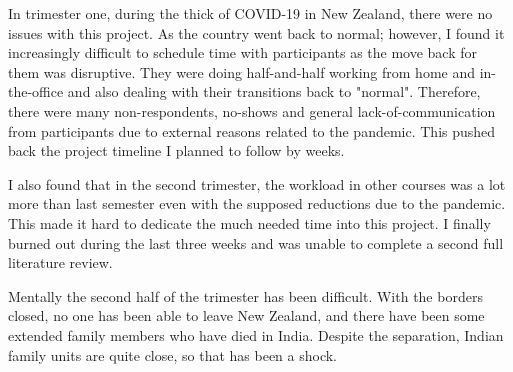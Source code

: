  \par In trimester one, during the thick of COVID-19 in New Zealand, there were no issues with this project. As the country went back to normal; however, I found it increasingly difficult to schedule time with participants as the move back for them was disruptive. They were doing half-and-half working from home and in-the-office and also dealing with their transitions back to "normal". Therefore, there were many non-respondents, no-shows and general lack-of-communication from participants due to external reasons related to the pandemic. This pushed back the project timeline I planned to follow by weeks. 
 \newline
\par I also found that in the second trimester, the workload in other courses was a lot more than last semester even with the supposed reductions due to the pandemic. This made it hard to dedicate the much needed time into this project. I finally burned out during the last three weeks and was unable to complete a second full literature review. 
\newline
\par Mentally the second half of the trimester has been difficult. With the borders closed, no one has been able to leave New Zealand, and there have been some extended family members who have died in India. Despite the separation, Indian family units are quite close, so that has been a shock. 

